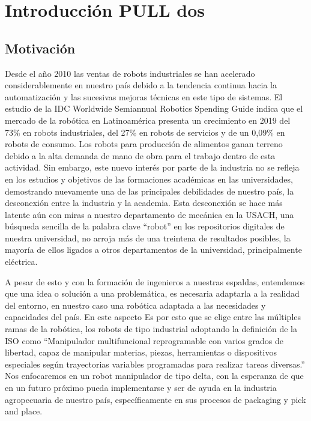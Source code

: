 \chapter{Introducción PULL dos}\label{CAP1}

\section{Motivación}

Desde el año 2010 las ventas de robots industriales se han acelerado considerablemente en nuestro país debido a la tendencia continua hacia la automatización y las sucesivas mejoras técnicas en este tipo de sistemas. El estudio de la IDC Worldwide Semiannual Robotics Spending Guide indica que el mercado de la robótica en Latinoamérica presenta un crecimiento en 2019 del 73\% en robots industriales, del 27\% en robots de servicios y de un 0,09\% en robots de consumo. Los robots para producción de alimentos ganan terreno debido a la alta demanda de mano de obra para el trabajo dentro de esta actividad. Sin embargo, este nuevo interés por parte de la industria no se refleja en los estudios y objetivos de las formaciones académicas en las universidades, demostrando nuevamente una de las principales debilidades de nuestro país, la desconexión entre la industria y la academia. Esta desconexión se hace más latente aún con miras a nuestro departamento de mecánica en la USACH, una búsqueda sencilla de la palabra clave “robot” en los repositorios digitales de nuestra universidad, no arroja más de una treintena de resultados posibles, la mayoría de ellos ligados a otros departamentos de la universidad, principalmente eléctrica.

A pesar de esto y con la formación de ingenieros a nuestras espaldas, entendemos que una idea o solución a una problemática, es necesaria adaptarla a la realidad del entorno, en nuestro caso una robótica adaptada a las necesidades y capacidades del país. En este aspecto   Es por esto que se elige entre las múltiples ramas de la robótica, los robots de tipo industrial adoptando la definición de la ISO como “Manipulador multifuncional reprogramable con varios grados de libertad, capaz de manipular materias, piezas, herramientas o dispositivos especiales según trayectorias variables programadas para realizar tareas diversas.” Nos enfocaremos en un robot manipulador de tipo delta, con la esperanza de que en un futuro próximo pueda implementarse y ser de ayuda en la industria agropecuaria de nuestro país, específicamente en sus procesos de packaging y pick and place.

